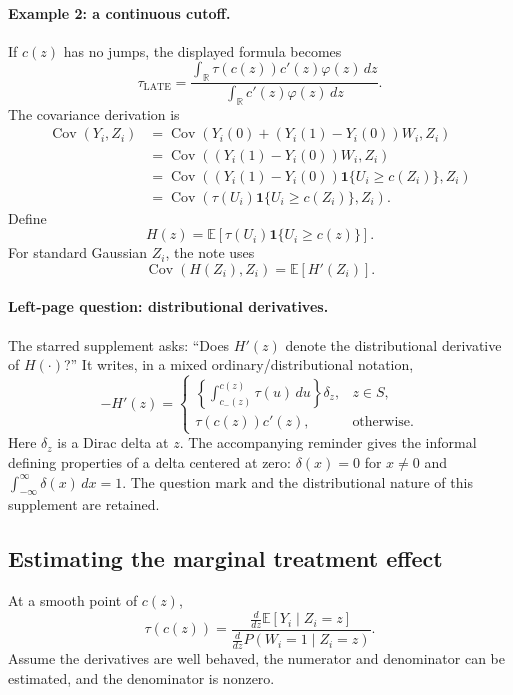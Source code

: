 \paragraph{Example 2: a continuous cutoff.}
If $c(z)$ has no jumps, the displayed formula becomes
\[
 \tau_{\mathrm{LATE}}=
 \frac{\displaystyle\int_{\mathbb R}\tau(c(z))c'(z)\varphi(z)\,dz}
 {\displaystyle\int_{\mathbb R}c'(z)\varphi(z)\,dz}.
\]
The covariance derivation is
\begin{align*}
 \operatorname{Cov}(Y_i,Z_i)
 &=\operatorname{Cov}(Y_i(0)+(Y_i(1)-Y_i(0))W_i,Z_i)\\
 &=\operatorname{Cov}((Y_i(1)-Y_i(0))W_i,Z_i)\\
 &=\operatorname{Cov}((Y_i(1)-Y_i(0))\mathbf1\{U_i\ge c(Z_i)\},Z_i)\\
 &=\operatorname{Cov}(\tau(U_i)\mathbf1\{U_i\ge c(Z_i)\},Z_i).
\end{align*}
Define
\[
 H(z)=\mathbb E[\tau(U_i)\mathbf1\{U_i\ge c(z)\}].
\]
For standard Gaussian $Z_i$, the note uses
\[
 \operatorname{Cov}(H(Z_i),Z_i)=\mathbb E[H'(Z_i)].
\]

\paragraph{Left-page question: distributional derivatives.}
The starred supplement asks: ``Does $H'(z)$ denote the distributional derivative of $H(\cdot)$?'' It writes, in a mixed ordinary/distributional notation,
\[
 -H'(z)=
 \begin{cases}
 \displaystyle\left\{\int_{c_-(z)}^{c(z)}\tau(u)\,du\right\}\delta_z,
 &z\in S,\\
 \tau(c(z))c'(z),&\text{otherwise}.
 \end{cases}
\]
Here $\delta_z$ is a Dirac delta at $z$. The accompanying reminder gives the informal defining properties of a delta centered at zero: $\delta(x)=0$ for $x\ne0$ and $\int_{-\infty}^{\infty}\delta(x)\,dx=1$. The question mark and the distributional nature of this supplement are retained.

\subsection{Estimating the marginal treatment effect}
At a smooth point of $c(z)$,
\[
 \tau(c(z))=
 \frac{\displaystyle\frac d{dz}\mathbb E[Y_i\mid Z_i=z]}
 {\displaystyle\frac d{dz}P(W_i=1\mid Z_i=z)}.\tag{10.12}
\]
Assume the derivatives are well behaved, the numerator and denominator can be estimated, and the denominator is nonzero.

